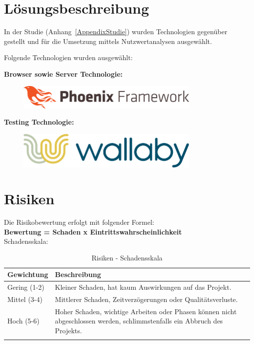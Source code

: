 \clearpage
\section{Lösungsbeschreibung}\label{loesungsbeschreibung}

In der Studie (Anhang~\ref{AppendixStudie}) wurden Technologien gegenüber
gestellt und für die Umsetzung mittels Nutzwertanalysen ausgewählt.

Folgende Technologien wurden ausgewählt:

\textbf{Browser sowie Server Technologie:}

\begin{figure}[!htb]
  \centering
  \includegraphics[width=0.8\textwidth]{figures/phoenix.png}
\end{figure}

\textbf{Testing Technologie:}

\begin{figure}[!htb]
  \centering
  \includegraphics[width=0.8\textwidth]{figures/wallaby.png}
\end{figure}

\clearpage
\section{Risiken}\label{risiken}

Die Risikobewertung erfolgt mit folgender Formel:\\

\textbf{Bewertung = Schaden x Eintrittswahrscheinlichkeit}\\

\noindent
Schadensskala:

\begin{longtable}[]{@{}lp{11cm}@{}}
  \toprule
  \textbf{Gewichtung} & \textbf{Beschreibung}\tabularnewline
  \midrule
  \endhead
  Gering (1-2)        & Kleiner Schaden, hat kaum Auswirkungen auf das Projekt.\tabularnewline
  Mittel (3-4)        & Mittlerer Schaden, Zeitverzögerungen oder Qualitätsverluste.\tabularnewline
  Hoch (5-6)          & Hoher Schaden, wichtige Arbeiten oder Phasen können nicht abgeschlossen werden, schlimmstenfalls ein Abbruch des Projekts.\tabularnewline
  \bottomrule
  \caption{Risiken - Schadensskala}
\end{longtable}

